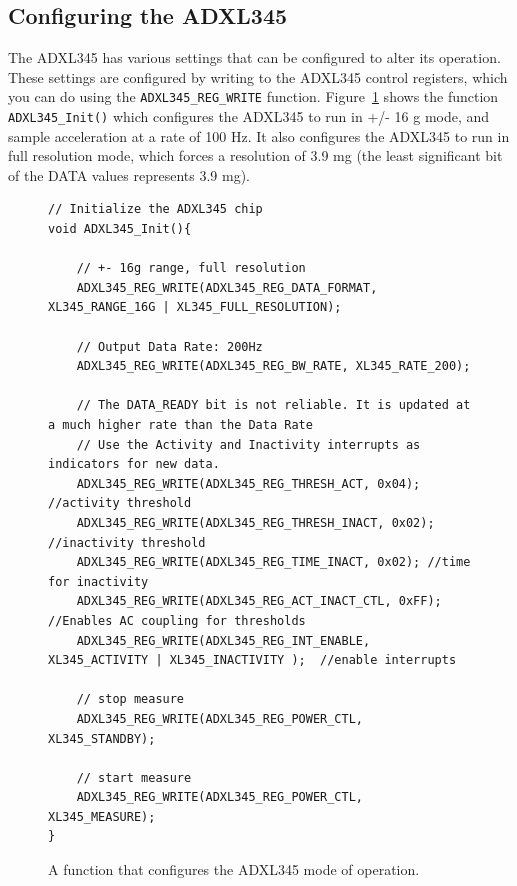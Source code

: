 \documentclass[11pt, twoside, pdftex]{article}
\begin{document}
\subsection{Configuring the ADXL345}

The ADXL345 has various settings that can be configured to alter its operation. These settings are configured by writing to the ADXL345 control registers, which you can do using the \texttt{ADXL345\_REG\_WRITE} function.  Figure~\ref{fig:config_adxl345} shows the function \texttt{ADXL345\_Init()} which configures the ADXL345 to run in +/- 16 g mode, and sample acceleration at a rate of 100 Hz. It also configures the ADXL345 to run in full resolution mode, which forces a resolution of 3.9 mg (the least significant bit of the DATA values represents 3.9 mg).

\begin{figure}[H]
\begin{center}
\begin{minipage}[t]{16 cm}
\begin{lstlisting}
// Initialize the ADXL345 chip
void ADXL345_Init(){
    
    // +- 16g range, full resolution
    ADXL345_REG_WRITE(ADXL345_REG_DATA_FORMAT, XL345_RANGE_16G | XL345_FULL_RESOLUTION);
    
    // Output Data Rate: 200Hz
    ADXL345_REG_WRITE(ADXL345_REG_BW_RATE, XL345_RATE_200);

    // The DATA_READY bit is not reliable. It is updated at a much higher rate than the Data Rate
    // Use the Activity and Inactivity interrupts as indicators for new data.
    ADXL345_REG_WRITE(ADXL345_REG_THRESH_ACT, 0x04); //activity threshold
    ADXL345_REG_WRITE(ADXL345_REG_THRESH_INACT, 0x02); //inactivity threshold
    ADXL345_REG_WRITE(ADXL345_REG_TIME_INACT, 0x02); //time for inactivity
    ADXL345_REG_WRITE(ADXL345_REG_ACT_INACT_CTL, 0xFF); //Enables AC coupling for thresholds
    ADXL345_REG_WRITE(ADXL345_REG_INT_ENABLE, XL345_ACTIVITY | XL345_INACTIVITY );	//enable interrupts
    
    // stop measure
    ADXL345_REG_WRITE(ADXL345_REG_POWER_CTL, XL345_STANDBY);
    
    // start measure
    ADXL345_REG_WRITE(ADXL345_REG_POWER_CTL, XL345_MEASURE);
}
\end{lstlisting}
\end{minipage}
\end{center}
\vspace{-0.33in}\caption{A function that configures the ADXL345 mode of operation.}
\label{fig:config_adxl345}
\end{figure}
\vspace{-10pt}
\end{document}

